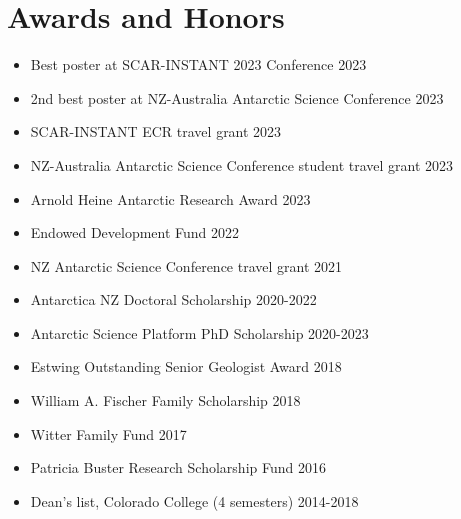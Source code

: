 \documentclass{ExpressiveResume}
\begin{document}




\section{Awards and Honors}
\begin{multicols}{2}
    \begin{itemize}
        \item Best poster at SCAR-INSTANT 2023 Conference \hfill 2023
        \item 2nd best poster at NZ-Australia Antarctic Science
              Conference \hfill 2023
        \item SCAR-INSTANT ECR travel grant \hfill 2023
        \item NZ-Australia Antarctic Science Conference student travel grant \hfill 2023
        \item Arnold Heine Antarctic Research Award \hfill 2023
        \item Endowed Development Fund \hfill 2022
        \item NZ Antarctic Science Conference travel grant \hfill 2021
        \item Antarctica NZ Doctoral Scholarship \hfill 2020-2022
        \item Antarctic Science Platform PhD Scholarship \hfill 2020-2023
        \item Estwing Outstanding Senior Geologist Award \hfill 2018
        \item William A. Fischer Family Scholarship \hfill 2018
        \item Witter Family Fund \hfill 2017
        \item Patricia Buster Research Scholarship Fund \hfill2016
        \item Dean's list, Colorado College (4 semesters) \hfill 2014-2018

    \end{itemize}
\end{multicols}
\end{document}

